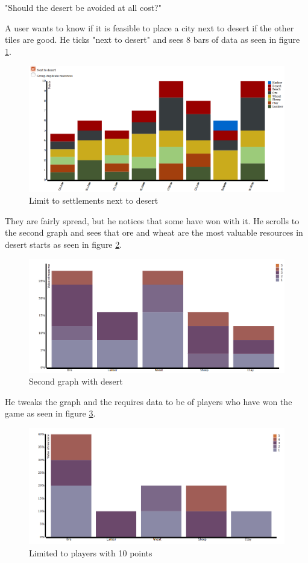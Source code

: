 \documentclass[journal]{vgtc}                %
\begin{document}
"Should the desert be avoided at all cost?"

A user wants to know if it is feasible to place a city next to desert if the
other tiles are good. He ticks "next to desert" and sees 8 bars of data as
seen in figure \ref{fig:s21}. 
\begin{figure}[!ht]
  \centering
  \includegraphics[width=\linewidth]{scen2-1.png}
  \caption{Limit to settlements next to desert}
  \label{fig:s21}
\end{figure}
\noindent
They are fairly spread, but he notices that some have won with it. He
scrolls to the second graph and sees that ore and wheat are the most valuable
resources in desert starts as seen in figure \ref{fig:s22}. 
\begin{figure}[!ht]
  \centering
  \includegraphics[width=\linewidth]{scen2-2.png}
  \caption{Second graph with desert}
  \label{fig:s22}
\end{figure}
\noindent
He tweaks the graph and the requires data to be
of players who have won the game as seen in figure \ref{fig:s23}. 
\begin{figure}[!ht]
  \centering
  \includegraphics[width=\linewidth]{scen2-3.png}
  \caption{Limited to players with 10 points}
  \label{fig:s23}
\end{figure}
\end{document}

